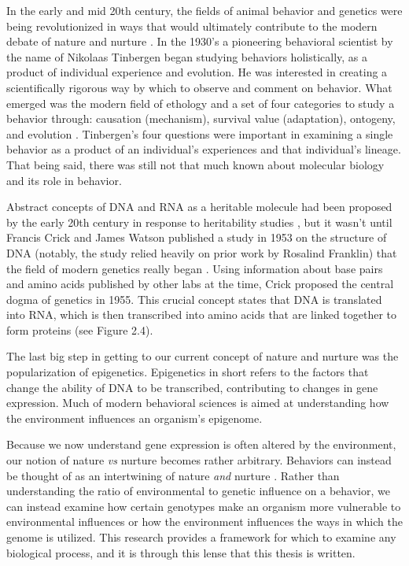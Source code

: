 \documentclass[12pt,twoside]{reedthesis}
\begin{document}
In the early and mid 20th century, the fields of animal behavior and
genetics were being revolutionized in ways that would ultimately contribute to the modern debate of
nature and nurture \citep{krubitzer_nature_2003}. In the 1930's a pioneering behavioral scientist by the name of Nikolaas Tinbergen began
studying behaviors holistically, as a product of individual
experience and evolution. He was interested in creating a scientifically
rigorous way by which to observe and comment on behavior.
What emerged was the modern field of ethology and a set of four categories to
study a behavior through: causation (mechanism), survival value (adaptation),
ontogeny, and evolution \citep{tinbergen_aims_2005}.
Tinbergen's four questions were important in examining a single behavior as a product of an
individual's experiences and that individual's lineage. That being said, there
was still not that much known about molecular biology and its role in behavior.

Abstract concepts of DNA and RNA as a heritable molecule had been proposed by the early 20th century in response to heritability
studies \citep{koltzoff_structure_1934, hershey_independent_1952}, but it wasn't until
Francis Crick and James Watson published a study in 1953 on the structure of DNA
(notably, the 
study relied heavily on prior work by Rosalind Franklin) that
the field of modern genetics really began \citep{watson_molecular_1953}. Using
information about base pairs and amino acids published by other labs at the
time, Crick proposed the
central dogma of genetics in 1955. This crucial concept states that DNA is translated into RNA, which is then
transcribed into amino acids that are linked together to form proteins (see
Figure 2.4).

The last big step in getting to our current concept of nature and nurture was
the popularization of epigenetics. Epigenetics in short refers to
the factors that change the ability of DNA to be transcribed, contributing to
changes in gene expression. Much of modern behavioral sciences is aimed at understanding
how the environment influences an organism's epigenome. 

Because we now understand gene expression is often altered by the environment, our notion of
nature \textit{vs} nurture becomes rather arbitrary. Behaviors can instead be
thought of as an intertwining of nature \textit{and} nurture
\citep{sasaki_nature_2017, meaney_nature_2006}. Rather than
understanding the ratio of environmental to genetic influence on a behavior, we
can instead examine how certain genotypes make an organism more vulnerable to
environmental influences or how the environment influences the ways in which the
genome is utilized. This research provides a framework for
which to examine any biological process, and it is through this lense that this
thesis is written.   
\end{document}
